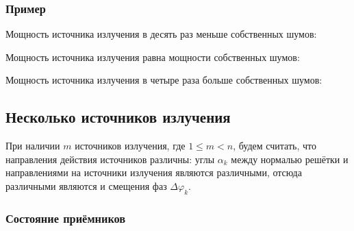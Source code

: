 \subsubsection{Пример}

Мощность источника излучения в десять раз меньше собственных шумов:

Мощность источника излучения равна мощности собственных шумов:

Мощность источника излучения в четыре раза больше собственных шумов:

\subsection{Несколько источников излучения}

При наличии $m$ источников излучения, где $1 \le m < n$, будем считать, что направления действия источников различны: углы $\alpha_k$ между нормалью решётки и направлениями
на источники излучения являются различными, отсюда различными являются и смещения фаз $\Delta \varphi_k$.

\subsubsection{Состояние приёмников}

